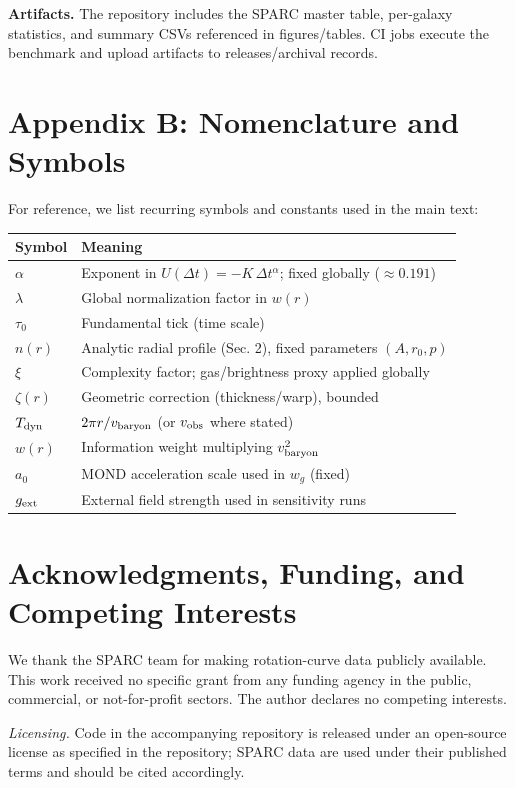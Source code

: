 \documentclass[12pt,a4paper]{article}
\begin{document}
\noindent\textbf{Artifacts.} The repository includes the SPARC master table, per-galaxy statistics, and summary CSVs referenced in figures/tables. CI jobs execute the benchmark and upload artifacts to releases/archival records.

\section*{Appendix B: Nomenclature and Symbols}
\noindent For reference, we list recurring symbols and constants used in the main text:
\begin{center}
\begin{tabular}{ll}
\toprule
Symbol & Meaning \\
\midrule
$\alpha$ & Exponent in $U(\Delta t)=-K\,\Delta t^{\alpha}$; fixed globally ($\approx0.191$) \\
$\lambda$ & Global normalization factor in $w(r)$ \\
$\tau_0$ & Fundamental tick (time scale) \\
$n(r)$ & Analytic radial profile (Sec. 2), fixed parameters $(A,r_0,p)$ \\
$\xi$ & Complexity factor; gas/brightness proxy applied globally \\
$\zeta(r)$ & Geometric correction (thickness/warp), bounded \\
$T_{\rm dyn}$ & $2\pi r/v_{\rm baryon}$ (or $v_{\rm obs}$ where stated) \\
$w(r)$ & Information weight multiplying $v_{\rm baryon}^2$ \\
$a_0$ & MOND acceleration scale used in $w_g$ (fixed) \\
$g_{\rm ext}$ & External field strength used in sensitivity runs \\
\bottomrule
\end{tabular}
\end{center}

\section*{Acknowledgments, Funding, and Competing Interests}
\noindent We thank the SPARC team for making rotation-curve data publicly available. This work received no specific grant from any funding agency in the public, commercial, or not-for-profit sectors. The author declares no competing interests.

\noindent \textit{Licensing.} Code in the accompanying repository is released under an open-source license as specified in the repository; SPARC data are used under their published terms and should be cited accordingly.
\end{document}

